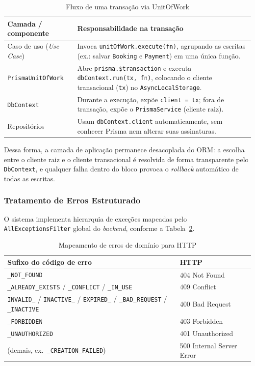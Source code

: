 \documentclass[12pt,openright,oneside,a4paper]{article}
\begin{document}
\begin{table}[H]
\centering
\caption{Fluxo de uma transação via UnitOfWork}
\label{tab:uow}
\begin{tabularx}{\textwidth}{l X}
\toprule
\textbf{Camada / componente} & \textbf{Responsabilidade na transação} \\
\midrule
Caso de uso (\textit{Use Case}) & Invoca \texttt{unitOfWork.execute(fn)}, agrupando as escritas (ex.: salvar \texttt{Booking} e \texttt{Payment}) em uma única função. \\
\texttt{PrismaUnitOfWork} & Abre \texttt{prisma.\$transaction} e executa \texttt{dbContext.run(tx, fn)}, colocando o cliente transacional (\texttt{tx}) no \texttt{AsyncLocalStorage}. \\
\texttt{DbContext} & Durante a execução, expõe \texttt{client = tx}; fora de transação, expõe o \texttt{PrismaService} (cliente raiz). \\
Repositórios & Usam \texttt{dbContext.client} automaticamente, sem conhecer Prisma nem alterar suas assinaturas. \\
\bottomrule
\end{tabularx}
\end{table}

Dessa forma, a camada de aplicação permanece desacoplada do ORM: a escolha entre o cliente raiz e o cliente transacional é resolvida de forma transparente pelo \texttt{DbContext}, e qualquer falha dentro do bloco provoca o \textit{rollback} automático de todas as escritas.

\subsubsection{Tratamento de Erros Estruturado}

O sistema implementa hierarquia de exceções mapeadas pelo \texttt{AllExceptionsFilter} global do \textit{backend}, conforme a Tabela~\ref{tab:error_mapping}.

\begin{table}[H]
\centering
\caption{Mapeamento de erros de domínio para HTTP}
\label{tab:error_mapping}
\begin{tabular}{ll}
\toprule
\textbf{Sufixo do código de erro} & \textbf{HTTP} \\
\midrule
\texttt{\_NOT\_FOUND} & 404 Not Found \\
\texttt{\_ALREADY\_EXISTS} / \texttt{\_CONFLICT} / \texttt{\_IN\_USE} & 409 Conflict \\
\texttt{INVALID\_} / \texttt{INACTIVE\_} / \texttt{EXPIRED\_} / \texttt{\_BAD\_REQUEST} / \texttt{\_INACTIVE} & 400 Bad Request \\
\texttt{\_FORBIDDEN} & 403 Forbidden \\
\texttt{\_UNAUTHORIZED} & 401 Unauthorized \\
(demais, ex.\ \texttt{\_CREATION\_FAILED}) & 500 Internal Server Error \\
\bottomrule
\end{tabular}
\end{table}
\end{document}

